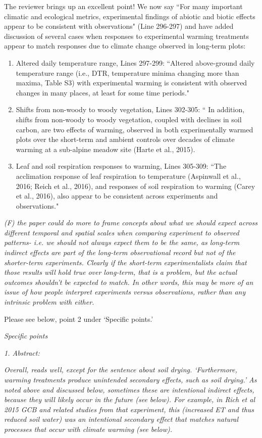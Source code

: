 \documentclass[11pt,a4paper]{letter}
\begin{document}
\begin{letter}{}
\par The reviewer brings up an excellent point! We now say ``For many important climatic and ecological metrics, experimental findings of abiotic and biotic effects
appear to be consistent with observations" (Line 296-297) and have added discussion of several cases when responses to experimental warming treatments appear to match responses due to climate change observed in long-term plots:
\begin{enumerate}
\item Altered daily temperature range, Lines 297-299: ``Altered above-ground daily temperature range (i.e., DTR, temperature minima changing more than maxima, Table S3) with experimental warming is consistent with observed changes in many places, at least for some time periods."
\item Shifts from non-woody to woody vegetation, Lines 302-305: `` In addition, shifts from non-woody to woody vegetation, coupled with declines in soil carbon, are two effects of warming, observed in both experimentally warmed plots over the short-term and ambient controls over decades of climate warming at a sub-alpine meadow site (Harte et al., 2015).
\item Leaf and soil respiration responses to warming, Lines 305-309: ``The acclimation response of leaf respiration to temperature (Aspinwall et al., 2016; Reich et al., 2016), and
responses of soil respiration to warming (Carey et al., 2016), also appear to be consistent across experiments and observations." 
\end {enumerate}
\par \emph{(F) the paper could do more to frame concepts about what we should expect across different temporal and spatial scales when comparing experiment to observed patterns- i.e. we should not always expect them to be the same, as long-term indirect effects are part of the long-term observational record but not of the shorter-term experiments. Clearly if the short-term experimentalists claim that those results will hold true over long-term, that is a problem, but the actual outcomes shouldn't be expected to match. In other words, this may be more of an issue of how people interpret experiments versus observations, rather than any intrinsic problem with either.}

\par Please see below, point 2 under `Specific points.'

\emph{Specific points}
\\
\par \emph{1. Abstract:}
\par \emph{Overall, reads well, except for the sentence about soil drying. `Furthermore, warming treatments produce unintended secondary effects, such as soil drying.' As noted above and discussed below, sometimes these are intentional indirect effects, because they will likely occur in the future (see below). For example, in Rich et al 2015 GCB and related studies from that experiment, this (increased ET and thus reduced soil water) was an intentional secondary effect that matches natural processes that occur with climate warming (see below).}


\end{letter}
\end{document}

